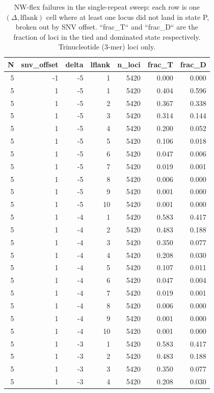 \begin{table}
\caption{NW-flex failures in the single-repeat sweep: each row is one $(\Delta, \text{lflank})$ cell where at least one locus did not land in state P, broken out by SNV offset.  ``frac\_T`` and ``frac\_D`` are the fraction of loci in the tied and dominated state respectively.  Trinucleotide (3-mer) loci only.}
\label{tab:single-nwflex-T-breakdown}
\begin{tabular}{rrrrrrr}
\toprule
N & snv_offset & delta & lflank & n_loci & frac_T & frac_D \\
\midrule
5 & -1 & -5 & 1 & 5420 & 0.000 & 0.000 \\
5 & 1 & -5 & 1 & 5420 & 0.404 & 0.596 \\
5 & 1 & -5 & 2 & 5420 & 0.367 & 0.338 \\
5 & 1 & -5 & 3 & 5420 & 0.314 & 0.144 \\
5 & 1 & -5 & 4 & 5420 & 0.200 & 0.052 \\
5 & 1 & -5 & 5 & 5420 & 0.106 & 0.018 \\
5 & 1 & -5 & 6 & 5420 & 0.047 & 0.006 \\
5 & 1 & -5 & 7 & 5420 & 0.019 & 0.001 \\
5 & 1 & -5 & 8 & 5420 & 0.006 & 0.000 \\
5 & 1 & -5 & 9 & 5420 & 0.001 & 0.000 \\
5 & 1 & -5 & 10 & 5420 & 0.001 & 0.000 \\
5 & 1 & -4 & 1 & 5420 & 0.583 & 0.417 \\
5 & 1 & -4 & 2 & 5420 & 0.483 & 0.188 \\
5 & 1 & -4 & 3 & 5420 & 0.350 & 0.077 \\
5 & 1 & -4 & 4 & 5420 & 0.208 & 0.030 \\
5 & 1 & -4 & 5 & 5420 & 0.107 & 0.011 \\
5 & 1 & -4 & 6 & 5420 & 0.047 & 0.004 \\
5 & 1 & -4 & 7 & 5420 & 0.019 & 0.001 \\
5 & 1 & -4 & 8 & 5420 & 0.006 & 0.000 \\
5 & 1 & -4 & 9 & 5420 & 0.001 & 0.000 \\
5 & 1 & -4 & 10 & 5420 & 0.001 & 0.000 \\
5 & 1 & -3 & 1 & 5420 & 0.583 & 0.417 \\
5 & 1 & -3 & 2 & 5420 & 0.483 & 0.188 \\
5 & 1 & -3 & 3 & 5420 & 0.350 & 0.077 \\
5 & 1 & -3 & 4 & 5420 & 0.208 & 0.030 \\

\end{tabular}
\end{table}
